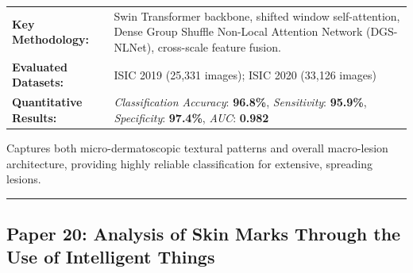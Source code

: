 \documentclass[10pt,a4paper]{article}
\begin{document}
\vspace{4pt}
\begin{tabularx}{\linewidth}{p{3.2cm}X}
\toprule
\textbf{Key Methodology:} & Swin Transformer backbone, shifted window self-attention, Dense Group Shuffle Non-Local Attention Network (DGS-NLNet), cross-scale feature fusion. \\
\textbf{Evaluated Datasets:} & ISIC 2019 (25,331 images); ISIC 2020 (33,126 images) \\
\textbf{Quantitative Results:} & \textit{Classification Accuracy}: \textbf{96.8\%}, \textit{Sensitivity}: \textbf{95.9\%}, \textit{Specificity}: \textbf{97.4\%}, \textit{AUC}: \textbf{0.982} \\
\bottomrule
\end{tabularx}
\vspace{4pt}
\begin{tcolorbox}[utilitybox,title=Clinical Utility and Real-World Impact]
Captures both micro-dermatoscopic textural patterns and overall macro-lesion architecture, providing highly reliable classification for extensive, spreading lesions.
\end{tcolorbox}
\vspace{12pt}
\hrule
\vspace{12pt}
\subsection*{Paper 20: Analysis of Skin Marks Through the Use of Intelligent Things}
\end{document}
